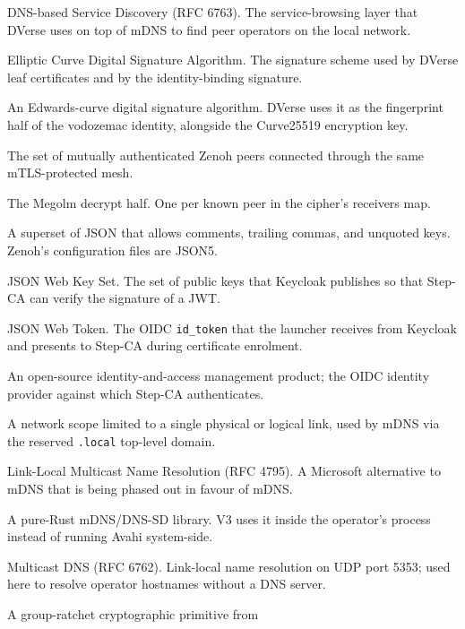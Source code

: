 \documentclass[11pt,a4paper]{article}
\begin{document}
\begin{description}[leftmargin=2.6cm, style=nextline, font=\sffamily\bfseries]
  \item[DNS-SD] DNS-based Service Discovery (RFC 6763). The
        service-browsing layer that DVerse uses on top of mDNS
        to find peer operators on the local network.
  \item[ECDSA] Elliptic Curve Digital Signature Algorithm.
        The signature scheme used by DVerse leaf certificates
        and by the identity-binding signature.
  \item[Ed25519] An Edwards-curve digital signature algorithm.
        DVerse uses it as the fingerprint half of the
        vodozemac identity, alongside the Curve25519
        encryption key.
  \item[fabric] The set of mutually authenticated Zenoh peers
        connected through the same mTLS-protected mesh.
  \item[\texttt{GroupReceiver}] The Megolm decrypt half. One
        per known peer in the cipher's receivers map.
  \item[JSON5] A superset of JSON that allows comments,
        trailing commas, and unquoted keys. Zenoh's
        configuration files are JSON5.
  \item[JWKS] JSON Web Key Set. The set of public keys that
        Keycloak publishes so that Step-CA can verify the
        signature of a JWT.
  \item[JWT] JSON Web Token. The OIDC \texttt{id\_token} that
        the launcher receives from Keycloak and presents to
        Step-CA during certificate enrolment.
  \item[Keycloak] An open-source identity-and-access
        management product; the OIDC identity provider
        against which Step-CA authenticates.
  \item[link-local] A network scope limited to a single
        physical or logical link, used by mDNS via the
        reserved \texttt{.local} top-level domain.
  \item[LLMNR] Link-Local Multicast Name Resolution
        (RFC 4795). A Microsoft alternative to mDNS that is
        being phased out in favour of mDNS.
  \item[\texttt{mdns-sd}] A pure-Rust mDNS/DNS-SD library. V3
        uses it inside the operator's process instead of
        running Avahi system-side.
  \item[mDNS] Multicast DNS (RFC 6762). Link-local name
        resolution on UDP port 5353; used here to resolve
        operator hostnames without a DNS server.
  \item[Megolm] A group-ratchet cryptographic primitive from

\end{description}
\end{document}
